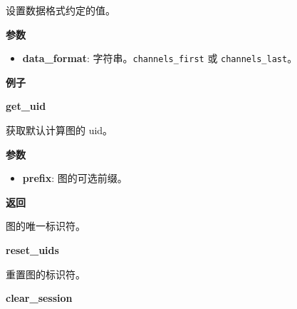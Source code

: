 设置数据格式约定的值。

\textbf{参数}

\begin{itemize}
\tightlist
\item
  \textbf{data\_format}:
  字符串。\texttt{\textquotesingle{}channels\_first\textquotesingle{}}
  或 \texttt{\textquotesingle{}channels\_last\textquotesingle{}}。
\end{itemize}

\textbf{例子}

\begin{Shaded}
\begin{Highlighting}[]
\OperatorTok{>>>}    
\OperatorTok{>>>} 
\OperatorTok{>>>} \NormalTok{)}
\OperatorTok{>>>} 
\end{Highlighting}
\end{Shaded}


\textbf{get\_uid}\label{getux5fuid}

\begin{Shaded}
\begin{Highlighting}[]
\OperatorTok{=}\NormalTok{)}
\end{Highlighting}
\end{Shaded}

获取默认计算图的 uid。

\textbf{参数}

\begin{itemize}
\tightlist
\item
  \textbf{prefix}: 图的可选前缀。
\end{itemize}

\textbf{返回}

图的唯一标识符。


\textbf{reset\_uids}\label{resetux5fuids}

\begin{Shaded}
\begin{Highlighting}[]
\end{Highlighting}
\end{Shaded}

重置图的标识符。


\textbf{clear\_session}\label{clearux5fsession}

